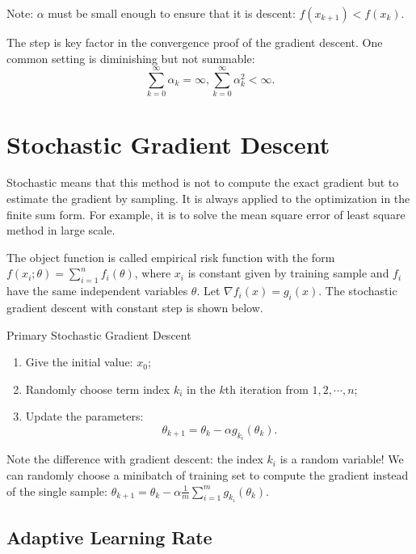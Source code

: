 \documentclass[11pt]{article} %
\begin{document}
Note: $\alpha$ must be small enough to ensure that it is descent: $f(x_{k+1})< f(x_{k})$.

The step is key factor in the convergence proof of the gradient descent.
One common setting is diminishing but not summable: $$\sum_{k=0}^{\infty} {\alpha}_{k}= \infty,\sum_{k=0}^{\infty} {\alpha}_{k}^{2}< \infty. $$
\section{Stochastic Gradient Descent}

Stochastic means that this method is not to compute the exact gradient but to estimate the gradient by sampling.
It is always applied to the optimization in the finite sum form. For example, it is to solve the mean square error of least square method in large scale.

The object function is called empirical risk function with the
form $f(x_i;\theta)=\sum_{i=1}^{n}f_{i}(\theta)$, where $x_i$ is constant given by training sample and $f_{i}$have the same independent variables $\theta$. Let $\nabla f_{i}(x) = g_{i}(x)$. The stochastic gradient descent with constant step is shown below.
\begin{algorithm}[htb]
\caption{Primary Stochastic Gradient Descent}
\label{SGD}
\begin{enumerate}
  \item Give the initial value: $x_0$;
  \item Randomly choose term index $k_{i}$ in the $k$th iteration from ${1,2,\cdots, n}$;
  \item Update the parameters: $${\theta}_{k+1}={\theta}_{k} - \alpha g_{k_{i}}({\theta}_{k}).$$
\end{enumerate}
\end{algorithm}

Note the difference with gradient descent: the index $k_{i}$ is a random variable!
We can randomly choose a minibatch of training set to compute the gradient instead of the single sample:
${\theta}_{k+1}={\theta}_{k} - \alpha \frac{1}{m}\sum_{i=1}^{m}g_{k_{i}}({\theta}_{k})$.


\subsection{Adaptive Learning Rate}
\end{document}
